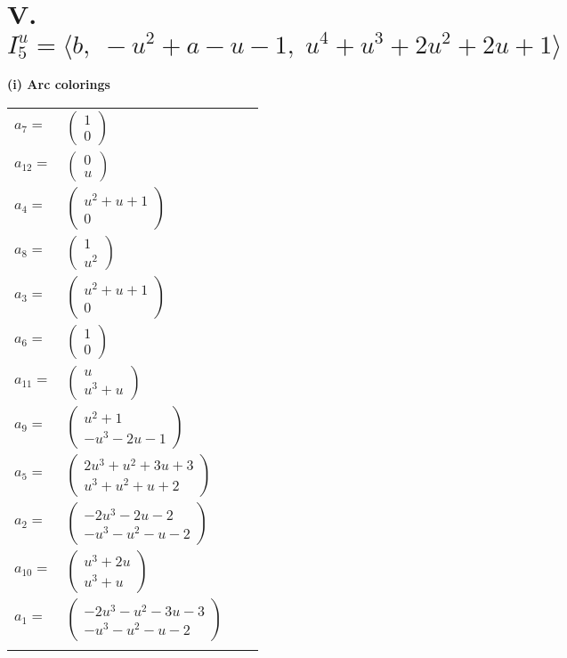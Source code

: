 \documentclass[1p]{elsarticle_modified}
\theoremstyle{definition}
\begin{document}
\centering \section*{V. $I^u_{5}= \langle b,\;- u^2+a- u-1,\;u^4+u^3+2 u^2+2 u+1 \rangle$}
\flushleft \textbf{(i) Arc colorings}\\
\begin{tabular}{m{7pt} m{180pt} m{7pt} m{180pt} }
\flushright $a_{7}=$&$\begin{pmatrix}1\\0\end{pmatrix}$ \\
\flushright $a_{12}=$&$\begin{pmatrix}0\\u\end{pmatrix}$ \\
\flushright $a_{4}=$&$\begin{pmatrix}u^2+u+1\\0\end{pmatrix}$ \\
\flushright $a_{8}=$&$\begin{pmatrix}1\\u^2\end{pmatrix}$ \\
\flushright $a_{3}=$&$\begin{pmatrix}u^2+u+1\\0\end{pmatrix}$ \\
\flushright $a_{6}=$&$\begin{pmatrix}1\\0\end{pmatrix}$ \\
\flushright $a_{11}=$&$\begin{pmatrix}u\\u^3+u\end{pmatrix}$ \\
\flushright $a_{9}=$&$\begin{pmatrix}u^2+1\\- u^3-2 u-1\end{pmatrix}$ \\
\flushright $a_{5}=$&$\begin{pmatrix}2 u^3+u^2+3 u+3\\u^3+u^2+u+2\end{pmatrix}$ \\
\flushright $a_{2}=$&$\begin{pmatrix}-2 u^3-2 u-2\\- u^3- u^2- u-2\end{pmatrix}$ \\
\flushright $a_{10}=$&$\begin{pmatrix}u^3+2 u\\u^3+u\end{pmatrix}$ \\
\flushright $a_{1}=$&$\begin{pmatrix}-2 u^3- u^2-3 u-3\\- u^3- u^2- u-2\end{pmatrix}$\\&\end{tabular}
\end{document}

